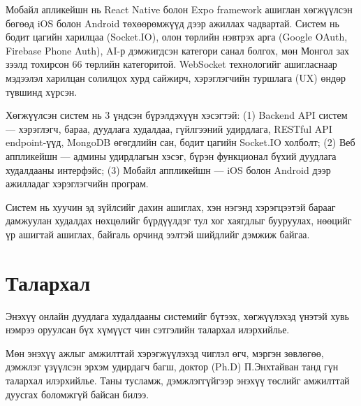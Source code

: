\documentclass[12pt, a4paper]{report}
\begin{document}
Мобайл апликейшн нь React Native болон Expo framework ашиглан хөгжүүлсэн бөгөөд iOS
болон Android төхөөрөмжүүд дээр ажиллах чадвартай. Систем нь бодит цагийн харилцаа
(Socket.IO), олон төрлийн нэвтрэх арга (Google OAuth, Firebase Phone Auth), AI-р
дэмжигдсэн категори санал болгох, мөн Монгол зах зээлд тохирсон 66 төрлийн категоритой.
WebSocket технологийг ашигласнаар мэдээлэл харилцан солилцох хурд сайжирч, хэрэглэгчийн
туршлага (UX) өндөр түвшинд хүрсэн.

Хөгжүүлсэн систем нь 3 үндсэн бүрэлдэхүүн хэсэгтэй: (1) Backend API систем —
хэрэглэгч, бараа, дуудлага худалдаа, гүйлгээний удирдлага, RESTful API endpoint-үүд,
MongoDB өгөгдлийн сан, бодит цагийн Socket.IO холболт; (2) Веб аппликейшн — админы
удирдлагын хэсэг, бүрэн функционал бүхий дуудлага худалдааны интерфэйс; (3) Мобайл
аппликейшн — iOS болон Android дээр ажилладаг хэрэглэгчийн програм.

Систем нь хуучин эд зүйлсийг дахин ашиглах, хэн нэгэнд хэрэгцээтэй барааг дамжуулан
худалдах нөхцөлийг бүрдүүлдэг тул хог хаягдлыг бууруулах, нөөцийг үр ашигтай ашиглах,
байгаль орчинд ээлтэй шийдлийг дэмжиж байгаа.

\clearpage

\chapter*{Талархал}
\thispagestyle{plain}

Энэхүү онлайн дуудлага худалдааны системийг бүтээх, хөгжүүлэхэд үнэтэй хувь нэмрээ
оруулсан бүх хүмүүст чин сэтгэлийн талархал илэрхийлье.

Мөн энэхүү ажлыг амжилттай хэрэгжүүлэхэд чиглэл өгч, мэргэн зөвлөгөө, дэмжлэг
үзүүлсэн эрхэм удирдагч багш, доктор (Ph.D) П.Энхтайван танд гүн талархал илэрхийлье.
Таны тусламж, дэмжлэггүйгээр энэхүү төслийг амжилттай дуусгах боломжгүй байсан билээ.

\clearpage

\tableofcontents
\newpage
\listoftables
\newpage
\listoffigures
\newpage

\setcounter{page}{1}
\pagestyle{fancy}

\end{document}
